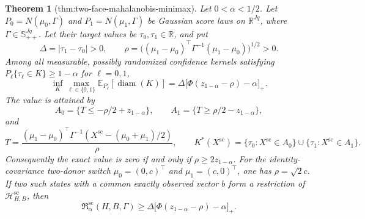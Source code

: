\documentclass{article}
\newtheorem{theorem}{Theorem}
\begin{document}
\begin{theorem}[thm:two-face-mahalanobis-minimax]\label{thm:two-face-mahalanobis-minimax}
Let \(0<\alpha<1/2\). Let \(P_0=N(\mu_0,\Gamma)\) and \(P_1=N(\mu_1,\Gamma)\) be Gaussian score laws on \(\mathbb R^{Jq}\), where \(\Gamma\in\mathbb S_{++}^{Jq}\). Let their target values be \(\tau_0,\tau_1\in\mathbb R\), and put
\[
 \Delta=|\tau_1-\tau_0|>0,
 \qquad
 \rho=\bigl((\mu_1-\mu_0)^{\top}\Gamma^{-1}(\mu_1-\mu_0)\bigr)^{1/2}>0.
\]
Among all measurable, possibly randomized confidence kernels satisfying \(P_\ell\{\tau_\ell\in K\}\geq1-\alpha\) for \(\ell=0,1\),
\[
 \inf_K\max_{\ell\in\{0,1\}}
 \mathbb E_{P_\ell}[\operatorname{diam}(K)]
 =\Delta\bigl[\Phi(z_{1-\alpha}-\rho)-\alpha\bigr]_+.
\]
The value is attained by
\[
 A_0=\{T\leq-\rho/2+z_{1-\alpha}\},
 \qquad
 A_1=\{T\geq\rho/2-z_{1-\alpha}\},
\]
and
\[
 T=\frac{(\mu_1-\mu_0)^{\top}\Gamma^{-1}
 (X^{\mathrm{sc}}-(\mu_0+\mu_1)/2)}{\rho},
 \qquad
 K^*(X^{\mathrm{sc}})
 =\{\tau_0:X^{\mathrm{sc}}\in A_0\}
 \cup\{\tau_1:X^{\mathrm{sc}}\in A_1\}.
\]
Consequently the exact value is zero if and only if \(\rho\geq2z_{1-\alpha}\). For the identity-covariance two-donor switch \(\mu_0=(0,c)^{\top}\) and \(\mu_1=(c,0)^{\top}\), one has \(\rho=\sqrt{2}c\). If two such states with a common exactly observed vector \(b\) form a restriction of \(\mathcal H_{H,B}^{\mathrm{sc}}\), then
\[
 \mathfrak R_{\alpha}^{\mathrm{sc}}(H,B,\Gamma)
 \geq
 \Delta\bigl[\Phi(z_{1-\alpha}-\rho)-\alpha\bigr]_+.
\]
\end{theorem}
\end{document}
